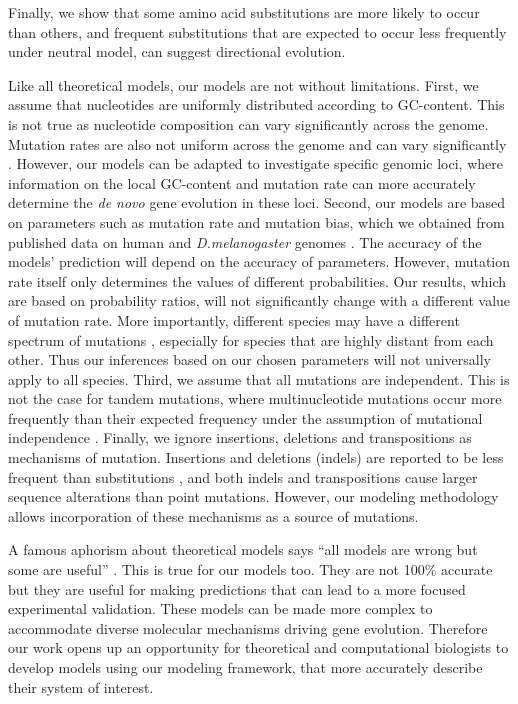 \documentclass[12pt,a4paper]{article}
\begin{document}
Finally, we show that some amino acid substitutions are more likely to occur than others, and frequent substitutions that are expected to occur less frequently under neutral model, can suggest directional evolution. 

Like all theoretical models, our models are not without limitations. First, we assume that nucleotides are uniformly distributed according to GC-content. This is not true as nucleotide composition can vary significantly across the genome. Mutation rates are also not uniform across the genome and can vary significantly \citep{mutbiasArabidopsis}. However, our models can be adapted to investigate specific genomic loci, where information on the local GC-content and mutation rate can more accurately determine the \textit{de novo} gene evolution in these loci. Second, our models are based on parameters such as mutation rate and mutation bias, which we obtained from published data on human and \textit{D.melanogaster} genomes \citep{humanmutrate,drosophilamutrate}. The accuracy of the models' prediction will depend on the accuracy of parameters. However, mutation rate itself only determines the values of different probabilities. Our results, which are based on probability ratios, will not significantly change with a different value of mutation rate. More importantly, different species may have a different spectrum of mutations \citep{joshmutbias}, especially for species that are highly distant from each other. Thus our inferences based on our chosen parameters will not universally apply to all species. Third, we assume that all mutations are independent. This is not the case for tandem mutations, where multinucleotide mutations occur more frequently than their expected frequency under the assumption of mutational independence \citep{MNM}. Finally, we ignore insertions, deletions and transpositions as mechanisms of mutation. Insertions and deletions (indels) are reported to be less frequent than substitutions \citep{drosophilamutrate}, and both indels and transpositions cause larger sequence alterations than point mutations. However, our modeling methodology allows incorporation of these mechanisms as a source of mutations. 

A famous aphorism about theoretical models says ``all models are wrong but some are useful'' \citep{GEBox}. This is true for our models too. They are not 100\% accurate but they are useful for making predictions that can lead to a more focused experimental validation. These models can be made more complex to accommodate diverse molecular mechanisms driving gene evolution. Therefore our work opens up an opportunity for theoretical and computational biologists to develop models using our modeling framework, that more accurately describe their system of interest.
\end{document}
